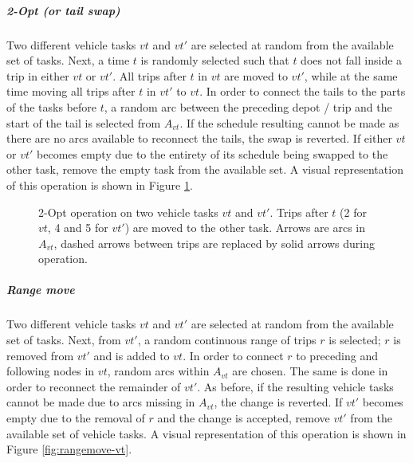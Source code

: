 \documentclass[]{article}
\begin{document}
\noindent\subparagraph{2-Opt (or tail swap)}  Two different vehicle tasks $vt$ and $vt'$ are selected at random from the available set of tasks. Next, a time $t$ is randomly selected such that $t$ does not fall inside a trip in either $vt$ or $vt'$. All trips after $t$ in $vt$ are moved to $vt'$, while at the same time moving all trips after $t$ in $vt'$ to $vt$. In order to connect the tails to the parts of the tasks before $t$, a random arc between the preceding depot / trip and the start of the tail is selected from $A_{vt}$. If the schedule resulting cannot be made as there are no arcs available to reconnect the tails, the swap is reverted. If either $vt$ or $vt'$ becomes empty due to the entirety of its schedule being swapped to the other task, remove the empty task from the available set. A visual representation of this operation is shown in Figure \ref{fig:2opt-vt}.
\begin{figure}[H]
  \centering
  \caption{2-Opt operation on two vehicle tasks $vt$ and $vt'$. Trips after $t$ (2 for $vt$, 4 and 5 for $vt'$) are moved to the other task. Arrows are arcs in $A_{vt}$, dashed arrows between trips are replaced by solid arrows during operation.}
  \label{fig:2opt-vt}
\end{figure}
\noindent\subparagraph{Range move} Two different vehicle tasks $vt$ and $vt'$ are selected at random from the available set of tasks. Next, from $vt'$, a random continuous range of trips $r$ is selected; $r$ is removed from $vt'$ and is added to $vt$. In order to connect $r$ to preceding and following nodes in $vt$, random arcs within $A_{vt}$ are chosen. The same is done in order to reconnect the remainder of $vt'$. As before, if the resulting vehicle tasks cannot be made due to arcs missing in $A_{vt}$, the change is reverted. If $vt'$ becomes empty due to the removal of $r$ and the change is accepted, remove $vt'$ from the available set of vehicle tasks. A visual representation of this operation is shown in Figure \ref{fig:rangemove-vt}.
\end{document}
